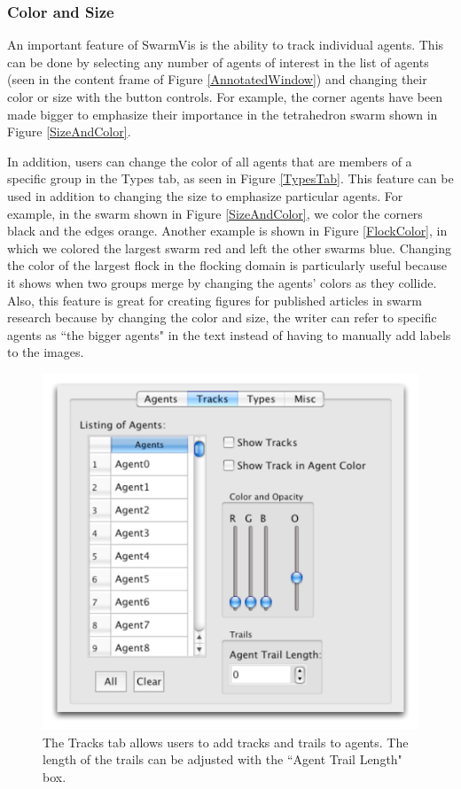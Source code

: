 \documentclass[conference]{IEEEtran}
\begin{document}
\subsubsection{Color and Size}

An important feature of SwarmVis is the ability to track individual agents.
This can be done by selecting any number of agents of interest in the list of agents
(seen in the content frame of Figure \ref{AnnotatedWindow})
and changing their color or size with the button controls.
For example, the corner agents have been made bigger to emphasize their importance
in the tetrahedron swarm shown in Figure \ref{SizeAndColor}.

In addition, users can change
the color of all agents that are members of a specific group in the Types tab, as seen
in Figure \ref{TypesTab}. This feature can be used in addition to changing the size to
emphasize particular agents. For example, in the swarm shown in
Figure \ref{SizeAndColor}, we color the corners black and the edges orange. Another
example is shown in Figure \ref{FlockColor}, in which we colored the largest swarm
red and left the other swarms blue. Changing the color of the largest flock in the flocking domain is
particularly useful because it shows when two groups merge by changing the agents' colors
as they collide.
Also, this feature is great for creating figures for published articles in swarm research because
by changing the color and size, the writer can refer to specific agents as ``the bigger agents"
in the text instead of having to manually add labels to the images.





\begin{figure}
\centering
\includegraphics[scale=.5]{images/trackstab.pdf}
\caption{
The Tracks tab allows users to add tracks and trails to agents. The length of the trails can be adjusted 
with the ``Agent Trail Length" box. }
\label{TracksTab}
\end{figure}
\end{document}
